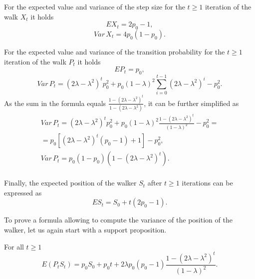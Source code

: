 \documentclass[runningheads]{CMSIM}
\begin{document}
    For the expected value and variance of the step size for the $t\ge1$
    iteration of the walk $X_{t}$ it holds~\cite{ja2019apmat}
    \begin{equation}
        EX_{t}=2p_{0}-1,\label{eq:e_x_t_sr}
    \end{equation}
    \begin{equation}
        Var\,X_{t}=4p_{0}(1-p_{0}).\label{eq:var_x_t_sr}
    \end{equation}

    For the expected value and variance of the transition probability
    for the $t\ge1$ iteration of the walk $P_{t}$ it holds~\cite{ja2019apmat}
    \begin{equation}
        EP_{t}=p_{0},\label{eq:e_p_t_sr}
    \end{equation}
    \begin{equation}
        Var\,P_{t}=(2\lambda-\lambda^{2})^{t}p_{0}^{2}+p_{0}(1-\lambda)^{2}\sum_{i=0}^{t-1}(2\lambda-\lambda^{2})^{i}-p_{0}^{2}.\label{eq:var_p_t_sr}
    \end{equation}
    As the sum in the formula equals $\frac{1-(2\lambda-\lambda^{2})^{t}}{1-(2\lambda-\lambda^{2})}$,
    it can be further simplified as
    \begin{gather*}
        Var\,P_{t}=(2\lambda-\lambda^{2})^{t}p_{0}^{2}+p_{0}(1-\lambda)^{2}\frac{1-(2\lambda-\lambda^{2})^{t}}{(1-\lambda)^{2}}-p_{0}^{2}=\\
        =p_{0}[(2\lambda-\lambda^{2})^{t}(p_{0}-1)+1]-p_{0}^{2},\\
        Var\,P_{t}=p_{0}(1-p_{0})(1-(2\lambda-\lambda^{2})^{t}).\\
    \end{gather*}

    Finally, the expected position of the walker $S_{t}$ after $t\geq1$
    iterations can be expressed as~\cite{ja2019apmat}
    \begin{equation}
        ES_{t}=S_{0}+t(2p_{0}-1).\label{eq:e_s_t_sr}
    \end{equation}

    To prove a formula allowing to compute the variance of the position
    of the walker, let us again start with a support proposition.
    \begin{proposition}
        For all $t\ge1$
        \begin{equation}
            E(P_{t}S_{t})=p_{0}S_{0}+p_{0}t+2\lambda p_{0}(p_{0}-1)\frac{1-(2\lambda-\lambda^{2})^{t}}{(1-\lambda)^{2}}.\label{eq:e_p_s_t_sr}
        \end{equation}
    \end{proposition}
\end{document}
